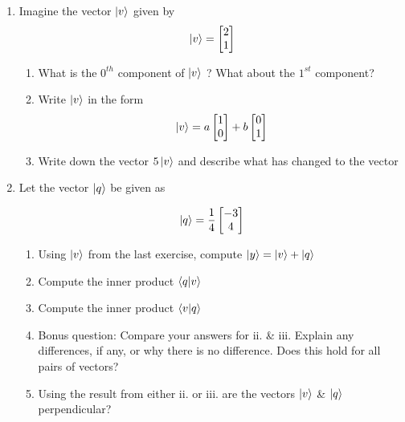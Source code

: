 \begin{enumerate}
        ii. $\braket{z|w}$

        iii. Bonus question: Compare i. ii. . Is the result the same as from Exercise 3.2 iv? 
        If not, what has changed?


    \item Imagine the vector $\ket{v}$ given by $$\ket{v} = \begin{bmatrix} 2 \\ 1 \end{bmatrix}$$
        \begin{enumerate}[i]
            \item What is the $0^{th}$ component of $\ket{v}$ ? What about the $1^{st}$ component?
            \item Write $\ket{v}$ in the form $$ \ket{v} = a\begin{bmatrix} 1 \\ 0 \end{bmatrix} + b \begin{bmatrix} 0 \\ 1 \end{bmatrix} $$
            \item Write down the vector $5\ket{v}$ and describe what has changed to the vector  
            
        \end{enumerate}

    \item Let the vector $\ket{q}$ be given as 

    $$ \ket{q} = \frac{1}{4} \begin{bmatrix} -3 \\ 4 \end{bmatrix} $$

    \begin{enumerate}[i]
        \item Using $\ket{v}$ from the last exercise, compute  $\ket{y} = \ket{v} + \ket{q} $
        \item Compute the inner product $ \braket{q | v} $
        \item Compute the inner product $ \braket{v | q} $ 
        \item Bonus question: Compare your answers for ii. \& iii. Explain any differences, if any, or why there is no difference. Does this hold for all pairs of vectors?
        \item Using the result from either ii. or iii. are the vectors $\ket{v}$ \& $\ket{q}$ perpendicular?
    
    \end{enumerate}
\end{enumerate}

